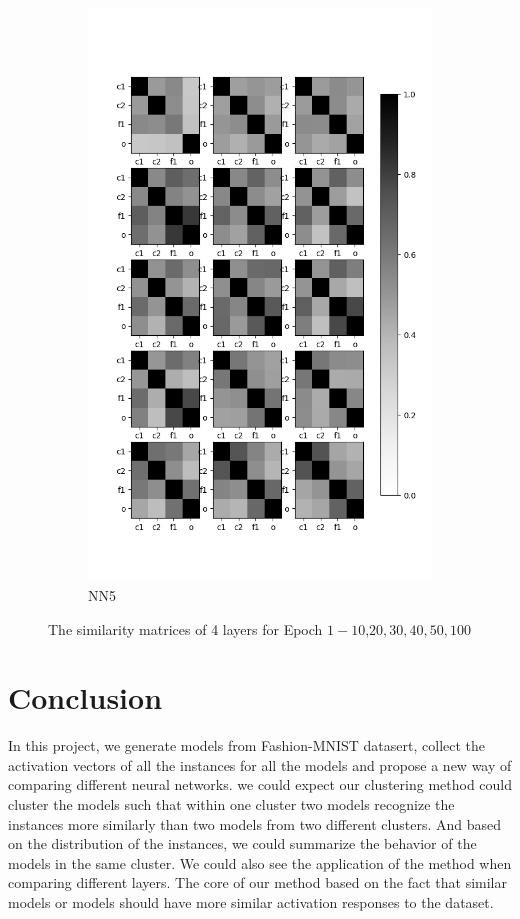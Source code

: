 \documentclass[11pt, twocolumn]{article}
\begin{document}
\begin{figure}
\begin{subfigure}[b]{0.3\textwidth}
		\includegraphics[width=\textwidth]{figs/nn6_sim.png}
		\caption[]%
		{{\small NN5}}    
		\label{fig:nn5}
	\end{subfigure}
		\caption[]
	{\small The similarity matrices of 4 layers for Epoch $1-10$,$20,30,40,50,100$} 
	\label{fig:layer-comparison}
\end{figure}



\section{Conclusion}
In this project, we generate models from Fashion-MNIST datasert, collect the activation vectors of all the instances for all the models and propose a new way of comparing different neural networks. we could expect our clustering method could cluster the models such that within one cluster  two models recognize the instances more similarly than two models from two different clusters. And based on the distribution of the instances, we could summarize the behavior of the models in the same cluster.  We could also see the application of the method when comparing different layers. The core of our method based on the fact that similar models or models should have more similar activation responses to the dataset.
\end{document}
